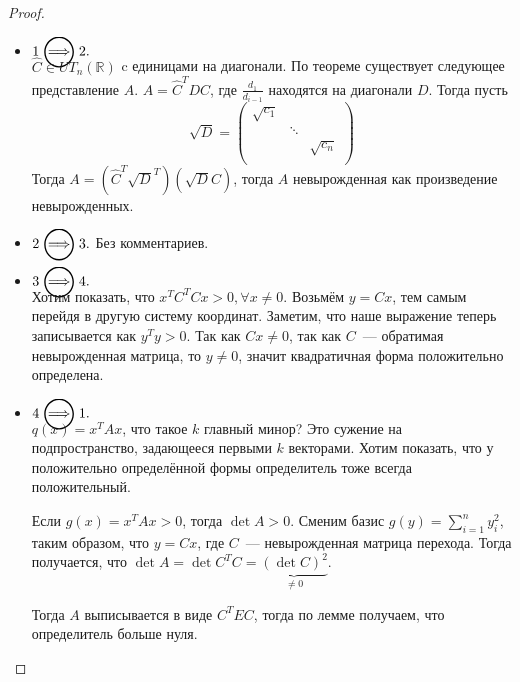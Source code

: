 \begin{proof}\leavevmode
    \begin{itemize}
        \item $1 \ora 2.$\\
            $\hat{C}\in UT_n(\mathbb{R})$ c единицами на диагонали.
            По теореме %
            существует следующее представление $A$.
            $A = \hat{C}^T D \hat{C}$, где $\frac{d_1}{d_{i - 1}}$ находятся на диагонали $D$.
            Тогда пусть
            \[
                \sqrt{D} = 
                \begin{pmatrix}
                    \sqrt{c_1} & &\\
                    & \ddots &\\
                    & & \sqrt{c_n}\\
                \end{pmatrix}
            \]
            Тогда $A = \left(\hat{C}^T\sqrt{D}^T\right)\left(\sqrt{D}\hat{C}\right)$, тогда $A$ невырожденная как произведение 
            невырожденных.
        \item
            $2 \ora 3.$ Без комментариев.
        \item
            $3 \ora 4.$\\
            Хотим показать, что $x^TC^T Cx > 0, \forall x\not=0$. Возьмём  $y  = Cx$, тем самым перейдя в другую систему 
            координат. Заметим, что наше выражение теперь записывается как  $y^Ty > 0$. Так как $Cx \not =0$, так как
            $C$~--- обратимая невырожденная матрица, то $y \not= 0$, значит квадратичная форма положительно определена.
        \item
            $4 \ora 1.$\\
            $q(x) = x^T A x$, что такое $k$ главный минор? Это сужение на подпространство, задающееся первыми 
            $k$ векторами.
            Хотим показать, что у положительно определённой формы определитель тоже всегда положительный.
            \begin{lemma}
                Если $g(x)  = x^T A x > 0$, тогда  $\det A > 0$.
                Сменим базис $g(y) = \sum\limits_{i = 1}^{n}{y_i^2}$, таким образом, что $y = Cx$, где $C$~--- невырожденная матрица
                перехода. Тогда получается, что $\det A = \det C^T C = \underbrace{(\det C)^2}_{\not= 0}$.
            \end{lemma}
            Тогда  $A$ выписывается в виде $C^TEC$, тогда по лемме получаем, что определитель больше нуля.
    \end{itemize}
\end{proof}
